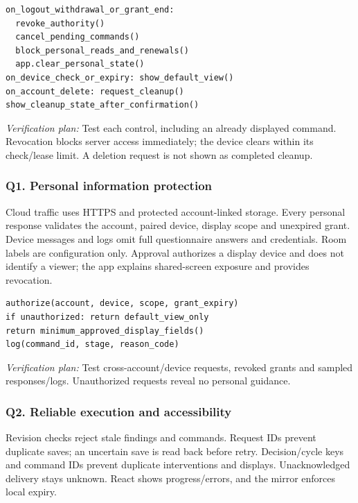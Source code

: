 \documentclass[conference,letterpaper]{IEEEtran}
\begin{document}
\begin{lstlisting}
on_logout_withdrawal_or_grant_end:
  revoke_authority()
  cancel_pending_commands()
  block_personal_reads_and_renewals()
  app.clear_personal_state()
on_device_check_or_expiry: show_default_view()
on_account_delete: request_cleanup()
show_cleanup_state_after_confirmation()
\end{lstlisting}



\textit{Verification plan:} Test each control, including an already displayed command. Revocation blocks server access immediately; the device clears within its check/lease limit. A deletion request is not shown as completed cleanup.

\subsubsection*{Q1. Personal information protection}

Cloud traffic uses HTTPS and protected account-linked storage. Every personal response validates the account, paired device, display scope and unexpired grant. Device messages and logs omit full questionnaire answers and credentials. Room labels are configuration only. Approval authorizes a display device and does not identify a viewer; the app explains shared-screen exposure and provides revocation.

\begin{lstlisting}
authorize(account, device, scope, grant_expiry)
if unauthorized: return default_view_only
return minimum_approved_display_fields()
log(command_id, stage, reason_code)
\end{lstlisting}



\textit{Verification plan:} Test cross-account/device requests, revoked grants and sampled responses/logs. Unauthorized requests reveal no personal guidance.

\subsubsection*{Q2. Reliable execution and accessibility}

Revision checks reject stale findings and commands. Request IDs prevent duplicate saves; an uncertain save is read back before retry. Decision/cycle keys and command IDs prevent duplicate interventions and displays. Unacknowledged delivery stays unknown. React shows progress/errors, and the mirror enforces local expiry.
\end{document}
